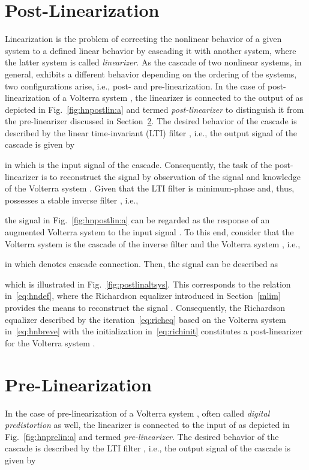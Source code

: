 \documentclass[10pt,twocolumn,twoside]{IEEEtran}
\begin{document}
\section{Post-Linearization}
	\label{postlin}

Linearization is the problem of correcting the nonlinear behavior of a
given system to a defined linear behavior by cascading it with another
system, where the latter system is called
\emph{linearizer}. As the cascade of two nonlinear systems,
in general, exhibits a different behavior depending on the ordering of the
systems, two configurations arise, i.e., post- and pre-linearization.
In the case of post-linearization of a Volterra system , the
linearizer is connected to the output of  as depicted in
Fig.~\ref{fig:hnpostlin:a} and termed \emph{post-linearizer}
to distinguish it from the pre-linearizer discussed in Section~\ref{prelin}.
The desired behavior of the cascade is described by the linear time-invariant
(LTI) filter , i.e., the output signal  of the cascade is given by

in which  is the input signal of the cascade. Consequently, the task of the
post-linearizer is to reconstruct the signal  by observation of the signal  and
knowledge of the Volterra system . Given that the LTI filter  is
minimum-phase and, thus, possesses a stable inverse filter , i.e.,

the signal  in Fig.~\ref{fig:hnpostlin:a} can be regarded as the response
of an augmented Volterra system  to the input signal .
To this end, consider that the Volterra system  is the cascade of the
inverse filter  and the Volterra system , i.e.,

in which  denotes cascade connection. Then, the signal 
can be described as

which is illustrated in Fig.~\ref{fig:postlinaltsys}.
This corresponds to the relation in~\eqref{eq:hndef},
where the Richardson equalizer introduced in Section~\ref{mlim} provides
the means to reconstruct the signal . Consequently, the Richardson
equalizer described by the iteration~\eqref{eq:richeq} based on the Volterra
system  in~\eqref{eq:hnbreve} with the initialization in~\eqref{eq:richinit}
constitutes a post-linearizer for the Volterra system .


\section{Pre-Linearization}
	\label{prelin}

In the case of pre-linearization of a Volterra system ,
often called \emph{digital predistortion} as well, the
linearizer is connected to the input of  as depicted in
Fig.~\ref{fig:hnprelin:a} and termed \emph{pre-linearizer}.
The desired behavior of the cascade is described by the LTI filter ,
i.e., the output signal  of the cascade is given by
\end{document}
